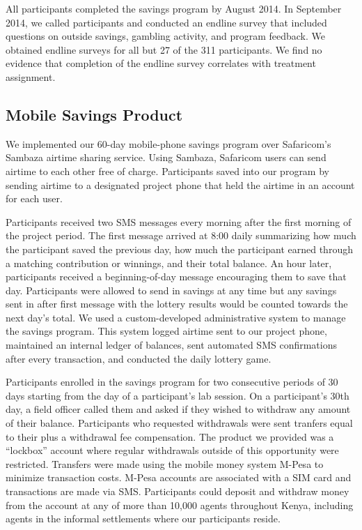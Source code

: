 \documentclass[11pt]{article}
\begin{document}
		All participants completed the savings program by August 2014. In September 2014, we called participants and conducted an endline survey that included questions on outside savings, gambling activity, and program feedback. We obtained endline surveys for all but 27 of the 311 participants. We find no evidence that completion of the endline survey correlates with treatment assignment.


		\clearpage

	\subsection{Mobile Savings Product}

		We implemented our 60-day mobile-phone savings program over Safaricom's Sambaza airtime sharing service. Using Sambaza, Safaricom users can send airtime to each other free of charge. Participants saved into our program by sending airtime to a designated project phone that held the airtime in an account for each user.

		Participants received two SMS messages every morning after the first morning of the project period. The first message arrived at 8:00 daily summarizing how much the participant saved the previous day, how much the participant earned through a matching contribution or winnings, and their total balance. An hour later, participants received a beginning-of-day message encouraging them to save that day. Participants were allowed to send in savings at any time but any savings sent in after first message with the lottery results would be counted towards the next day's total. We used a custom-developed administrative system to manage the savings program. This system logged airtime sent to our project phone, maintained an internal ledger of balances, sent automated SMS confirmations after every transaction, and conducted the daily lottery game.

		Participants enrolled in the savings program for two consecutive periods of 30 days starting from the day of a participant's lab session. On a participant's 30th day, a field officer called them and asked if they wished to withdraw any amount of their balance. Participants who requested withdrawals were sent tranfers equal to their plus a withdrawal fee compensation. The product we provided was a ``lockbox'' account where regular withdrawals outside of this opportunity were restricted. Transfers were made using the mobile money system M-Pesa to minimize transaction costs. M-Pesa accounts are associated with a SIM card and transactions are made via SMS. Participants could deposit and withdraw money from the account at any of more than 10,000 agents throughout Kenya, including agents in the informal settlements where our participants reside.
\end{document}
